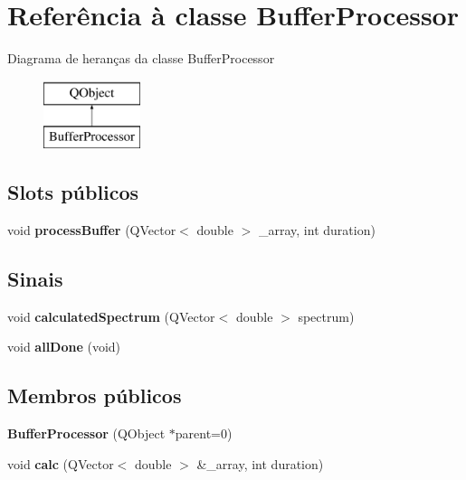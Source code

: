 \hypertarget{class_buffer_processor}{\section{Referência à classe Buffer\-Processor}
\label{class_buffer_processor}
}
Diagrama de heranças da classe Buffer\-Processor\begin{figure}[H]
\begin{center}
\leavevmode
\includegraphics[height=2.000000cm]{class_buffer_processor}
\end{center}
\end{figure}
\subsection*{Slots públicos}
\begin{DoxyCompactItemize}
\item 
\hypertarget{class_buffer_processor_a19fedc34939ba4579b9a9bc3c53b7503}{void {\bfseries process\-Buffer} (Q\-Vector$<$ double $>$ \-\_\-array, int duration)}\label{class_buffer_processor_a19fedc34939ba4579b9a9bc3c53b7503}

\end{DoxyCompactItemize}
\subsection*{Sinais}
\begin{DoxyCompactItemize}
\item 
\hypertarget{class_buffer_processor_a466db3cca5282cd8b1d8c2ad6289ba35}{void {\bfseries calculated\-Spectrum} (Q\-Vector$<$ double $>$ spectrum)}\label{class_buffer_processor_a466db3cca5282cd8b1d8c2ad6289ba35}

\item 
\hypertarget{class_buffer_processor_a9dd9e6636e0dc2a4a263f045a3338013}{void {\bfseries all\-Done} (void)}\label{class_buffer_processor_a9dd9e6636e0dc2a4a263f045a3338013}

\end{DoxyCompactItemize}
\subsection*{Membros públicos}
\begin{DoxyCompactItemize}
\item 
\hypertarget{class_buffer_processor_a910d84b159f28bcaf05b47ce7e81eb0c}{{\bfseries Buffer\-Processor} (Q\-Object $\ast$parent=0)}\label{class_buffer_processor_a910d84b159f28bcaf05b47ce7e81eb0c}

\item 
\hypertarget{class_buffer_processor_af90a936a161872a0a4d4406af2822db9}{void {\bfseries calc} (Q\-Vector$<$ double $>$ \&\-\_\-array, int duration)}\label{class_buffer_processor_af90a936a161872a0a4d4406af2822db9}

\end{DoxyCompactItemize}
